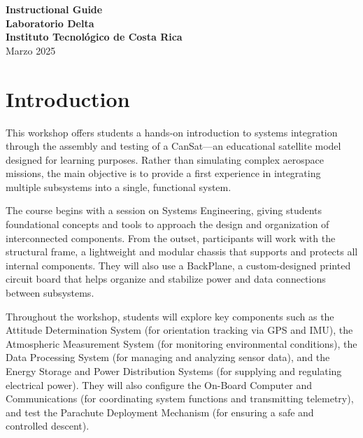 \documentclass[a4paper,12pt]{article}
\begin{document}
\setlength{\parskip}{3mm}

\begin{titlepage}
    \centering
    {\Huge \textbf{Instructional Guide}}\\[1.5cm] %
    
    \textbf{\Large Laboratorio Delta }\\[0.5cm]  %
    
    \textbf{\large Instituto Tecnológico de Costa Rica}\\[0.5cm] %
    
    
    {\Large Marzo 2025}\\[2cm]  %

    
\end{titlepage}

\newpage

\section{Introduction}

This workshop offers students a hands-on introduction to systems integration through the assembly and testing of a CanSat—an educational satellite model designed for learning purposes. Rather than simulating complex aerospace missions, the main objective is to provide a first experience in integrating multiple subsystems into a single, functional system.

The course begins with a session on Systems Engineering, giving students foundational concepts and tools to approach the design and organization of interconnected components. From the outset, participants will work with the structural frame, a lightweight and modular chassis that supports and protects all internal components. They will also use a BackPlane, a custom-designed printed circuit board that helps organize and stabilize power and data connections between subsystems.

Throughout the workshop, students will explore key components such as the Attitude Determination System (for orientation tracking via GPS and IMU), the Atmospheric Measurement System (for monitoring environmental conditions), the Data Processing System (for managing and analyzing sensor data), and the Energy Storage and Power Distribution Systems (for supplying and regulating electrical power). They will also configure the On-Board Computer and Communications (for coordinating system functions and transmitting telemetry), and test the Parachute Deployment Mechanism (for ensuring a safe and controlled descent).
\end{document}
